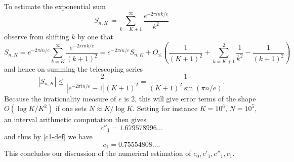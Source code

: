 \documentclass[10pt,a4paper,reqno]{amsart}
\numberwithin{equation}{section}
\theoremstyle{plain}
\theoremstyle{definition}
\begin{document}
To estimate the exponential sum
$$ S_{n,K} \coloneqq \sum_{k=K+1}^\infty \frac{e^{-2\pi i n k/e}}{k^2}$$
observe from shifting $k$ by one that
$$ S_{n,K} = e^{-2\pi i n/e} \sum_{k=K}^\infty \frac{e^{-2\pi i n k/e}}{(k+1)^2}
= e^{-2\pi i n/e} S_{n,K} + O_{\leq}\left( \frac{1}{(K+1)^2} + \sum_{k=K+1}^2 \frac{1}{k^2} -\frac{1}{(k+1)^2}\right)$$
and hence on summing the telescoping series
$$ |S_{n,K}| \leq \frac{2}{|e^{-2\pi i n/e}-1| (K+1)^2} = \frac{1}{(K+1)^2 \sin(\pi n/e)}.$$
Because the irrationality measure of $e$ is $2$, this will give error terms of the shape $O(\log K/K^2)$ if one sets $N \approx K / \log K$.  Setting for instance $K = 10^6$, $N = 10^5$, an interval arithmetic computation then gives
$$c''_1 = 1.679578996\dots$$
and thus by \eqref{c1-def} we have
$$ c_1 = 0.75554808\dots.$$
This concludes our discussion of the numerical estimation of $c_0, c'_1, c''_1, c_1$.
\end{document}
